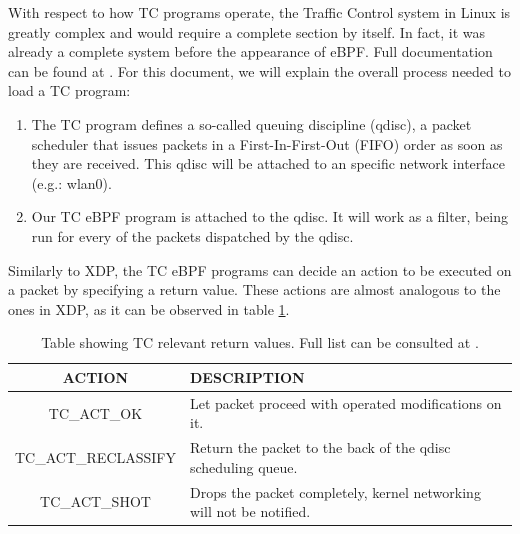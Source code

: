 \documentclass[12pt]{report} %
\begin{document}
With respect to how TC programs operate, the Traffic Control system in Linux is greatly complex and would require a complete section by itself. In fact, it was already a complete system before the appearance of eBPF. Full documentation can be found at \cite{tc_docs_complete}. For this document, we will explain the overall process needed to load a TC program\cite{tc_direct_action}:
\begin{enumerate}
\item The TC program defines a so-called queuing discipline (qdisc), a packet scheduler that issues packets in a First-In-First-Out (FIFO) order as soon as they are received. This qdisc will be attached to an specific network interface (e.g.: wlan0).
\item Our TC eBPF program is attached to the qdisc. It will work as a filter, being run for every of the packets dispatched by the qdisc.
\end{enumerate}

Similarly to XDP, the TC eBPF programs can decide an action to be executed on a packet by specifying a return value. These actions are almost analogous to the ones in XDP, as it can be observed in table \ref{table:tc_actions}.

\begin{table}[H]
\begin{tabular}{|c|>{\centering\arraybackslash}p{10cm}|}
\hline
ACTION & DESCRIPTION\\
\hline
\hline
TC\_ACT\_OK & Let packet proceed with operated modifications on it.\\
\hline
TC\_ACT\_RECLASSIFY & Return the packet to the back of the qdisc scheduling queue.\\
\hline
TC\_ACT\_SHOT & Drops the packet completely, kernel networking will not be notified.\\
\hline
\end{tabular}
\caption{Table showing TC relevant return values. Full list can be consulted at \cite{tc_ret_list_complete}.}
\label{table:tc_actions}
\end{table}
\end{document}
